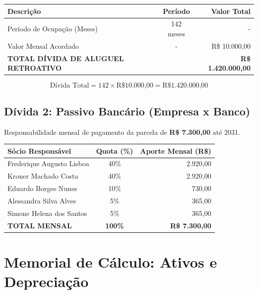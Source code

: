 \documentclass[12pt, a4paper]{article}
\newcommand{\reais}[1]{R\$ #1}
\begin{document}
\begin{table}[h!]
    \centering
    \small
    \begin{tabularx}{\textwidth}{X c r}
        \toprule
        \textbf{Descrição} & \textbf{Período} & \textbf{Valor Total} \\
        \midrule
        Período de Ocupação (Meses) & 142 meses & - \\
        Valor Mensal Acordado & - & \reais{10.000,00} \\
        \midrule
        \rowcolor{accentColor!10} \textbf{TOTAL DÍVIDA DE ALUGUEL RETROATIVO} & & \textbf{\reais{1.420.000,00}} \\
        \bottomrule
    \end{tabularx}
\end{table}

\[
\text{Dívida Total} = 142 \times \text{R\$ 10.000,00} = \text{R\$ 1.420.000,00}
\]

\newpage

\subsection{Dívida 2: Passivo Bancário (Empresa x Banco)}
Responsabilidade mensal de pagamento da parcela de \textbf{\reais{7.300,00}} até 2031.

\begin{table}[h!]
    \centering
    \small
    \begin{tabularx}{\textwidth}{X c r}
        \toprule
        \textbf{Sócio Responsável} & \textbf{Quota (\%)} & \textbf{Aporte Mensal (R\$)} \\
        \midrule
        Frederique Augusto Lisboa & 40\% & 2.920,00 \\
        Kroner Machado Costa & 40\% & 2.920,00 \\
        Eduardo Borges Nunes & 10\% & 730,00 \\
        Alessandra Silva Alves & 5\% & 365,00 \\
        Simone Helena dos Santos & 5\% & 365,00 \\
        \midrule
        \rowcolor{lightGray} \textbf{TOTAL MENSAL} & \textbf{100\%} & \textbf{\reais{7.300,00}} \\
        \bottomrule
    \end{tabularx}
\end{table}

\section{Memorial de Cálculo: Ativos e Depreciação}
\end{document}
